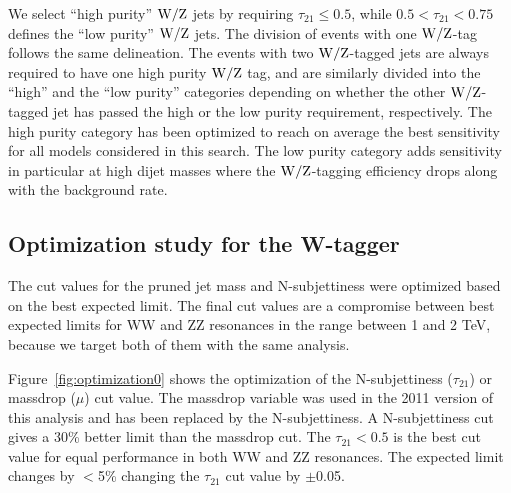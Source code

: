 
We select ``high purity'' ${\rm W}/{\rm Z}$ jets by
requiring $\tau_{21} \leq 0.5$, while $ 0.5 <
\tau_{21} < 0.75$ defines the ``low purity'' ${\rm W}/{\rm Z}$ jets.
%
The division of events with one ${\rm W}/{\rm Z}$-tag follows the same delineation.
%
The events with two ${\rm W}/{\rm Z}$-tagged jets are always required 
to have one high purity ${\rm W}/{\rm Z}$ tag, and are similarly divided
into the ``high'' and the ``low purity'' categories depending on whether
the other ${\rm W}/{\rm Z}$-tagged jet has passed the high or the low purity requirement, 
respectively.
%
The high purity category has been optimized to reach on average the
best sensitivity for all models considered in this search.  The low
purity category adds sensitivity in particular at high dijet masses
where the ${\rm W}/{\rm Z}$-tagging efficiency drops along with the
background rate.

\subsection{Optimization study for the W-tagger}
\label{sec:optimal}

The cut values for the pruned jet mass and N-subjettiness were optimized based on the best expected limit.
The final cut values are a compromise between best expected limits for WW and ZZ resonances in the range between 1 and 2 TeV, because we target both of them with the same analysis.

Figure~\ref{fig:optimization0} shows the optimization of the N-subjettiness ($\tau_{21}$) or massdrop ($\mu$) cut value.
The massdrop variable was used in the 2011 version of this analysis and has been replaced by the 
N-subjettiness.
A N-subjettiness cut gives a 30\% better limit than the massdrop cut.
The $\tau_{21}<0.5$ is the best cut value for equal performance in both WW and ZZ resonances.
The expected limit changes by $<$5\% changing the $\tau_{21}$ cut value by $\pm$0.05.

